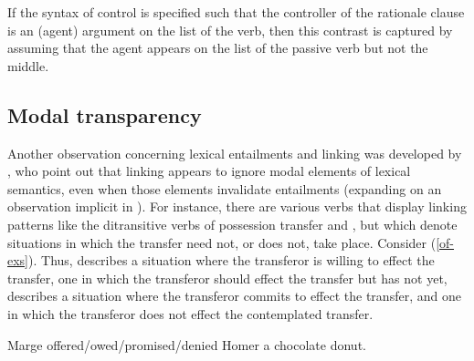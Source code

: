 \documentclass[output=paper
 	        ,biblatex
                ,babelshorthands
                ,newtxmath
                ,draftmode
                ,colorlinks, citecolor=brown
]{langscibook}
\begin{document}
\noindent
If the syntax of control  is specified such that the controller of the rationale clause is an (agent) argument on the \argst list of the verb, then this contrast is captured by assuming that the agent appears on the \argst list of the passive verb but not the middle.


\subsection{Modal transparency}
Another observation concerning lexical entailments and linking was developed by \citet{KoenigandDavis2001}, who point out that linking appears to ignore modal elements of lexical semantics, even when those elements invalidate entailments (expanding on an observation implicit in \citealt{Goldberg1995}).
For instance, there are various  verbs that display linking patterns like the ditransitive verbs of possession transfer  and , but which denote situations in which the transfer need not, or does not, take place. Consider (\ref{of-exs}).
Thus,  describes a situation where the transferor is willing to effect the transfer,  one in which the transferor should effect the transfer but has not yet,  describes a situation where the transferor commits to effect the transfer, and  one in which the transferor does not effect the contemplated transfer. 

\begin{exe}
\ex \label{of-exs}Marge offered/owed/promised/denied Homer a chocolate donut.
\end{exe}
\end{document}
